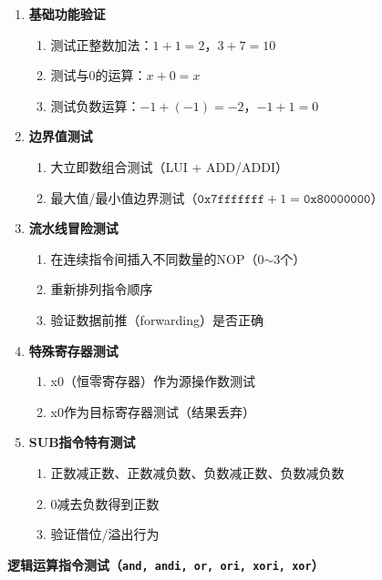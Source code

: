 \documentclass[12pt,a4paper]{ctexart}
\newcommand{\code}[1]{\texttt{#1}}
\begin{document}
\begin{enumerate}
    \item \textbf{基础功能验证}
    \begin{enumerate}
        \item 测试正整数加法：$1+1=2$，$3+7=10$
        \item 测试与0的运算：$x+0=x$
        \item 测试负数运算：$-1+(-1)=-2$，$-1+1=0$
    \end{enumerate}
    
    \item \textbf{边界值测试}
    \begin{enumerate}
        \item 大立即数组合测试（LUI + ADD/ADDI）
        \item 最大值/最小值边界测试（$\texttt{0x7fffffff} + 1 = \texttt{0x80000000}$）
    \end{enumerate}
    
    \item \textbf{流水线冒险测试}
    \begin{enumerate}
        \item 在连续指令间插入不同数量的NOP（0$\sim$3个）
        \item 重新排列指令顺序
        \item 验证数据前推（forwarding）是否正确
    \end{enumerate}
    
    \item \textbf{特殊寄存器测试}
    \begin{enumerate}
        \item x0（恒零寄存器）作为源操作数测试
        \item x0作为目标寄存器测试（结果丢弃）
    \end{enumerate}
    
    \item \textbf{SUB指令特有测试}
    \begin{enumerate}
        \item 正数减正数、正数减负数、负数减正数、负数减负数
        \item 0减去负数得到正数
        \item 验证借位/溢出行为
    \end{enumerate}
\end{enumerate}

\textbf{逻辑运算指令测试（\code{and, andi, or, ori, xori, xor}）}
\end{document}
